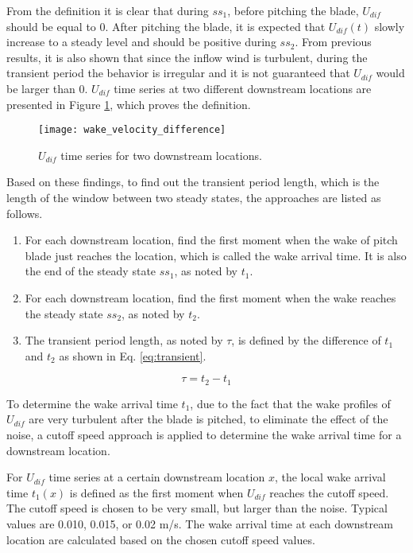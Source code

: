 \documentclass{umthesis}
\begin{document}
From the definition it is clear that during $ss_1$, before pitching the blade, $U_{dif}$ should be equal to 0. After pitching the blade, it is expected that $U_{dif}(t)$ slowly increase to a steady level and  should be positive during $ss_2$. From previous results, it is also shown that since the inflow wind is turbulent, during the transient period the behavior is irregular and it is not guaranteed that $U_{dif}$ would be larger than 0. $U_{dif}$ time series at two different downstream locations are presented in Figure \ref{fig:wake_velocity_difference}, which proves the definition.

\begin{figure}
  \centering
  \texttt{[image: wake\_velocity\_difference]}
  \caption{$U_{dif}$ time series for two downstream locations.}\label{fig:wake_velocity_difference}
\end{figure}

Based on these findings, to find out the transient period length, which is the length of the window between two steady states, the approaches are listed as follows.

\begin{enumerate}
  \item For each downstream location, find the first moment when the wake of pitch blade just reaches the location, which is called the wake arrival time. It is also the end of the steady state $ss_1$, as noted by $t_1$.
  \item For each downstream location, find the first moment when the wake reaches the steady state $ss_2$, as noted by $t_2$.
  \item The transient period length, as noted by $\tau$, is defined by the difference of $t_1$ and $t_2$ as shown in Eq. \ref{eq:transient}.
\end{enumerate}

\begin{equation}\label{eq:transient}
  \tau = t_2 - t_1
\end{equation}

To determine the wake arrival time $t_1$, due to the fact that the wake profiles of $U_{dif}$ are very turbulent after the blade is pitched, to eliminate the effect of the noise, a cutoff speed approach is applied to determine the wake arrival time for a downstream location.

For $U_{dif}$ time series at a certain downstream location $x$, the local wake arrival time $t_1(x)$ is defined as the first moment when $U_{dif}$ reaches the cutoff speed. The cutoff speed is chosen to be very small, but larger than the noise. Typical values are 0.010, 0.015, or 0.02 m/s. The wake arrival time at each downstream location are calculated based on the chosen cutoff speed values.
\end{document}
